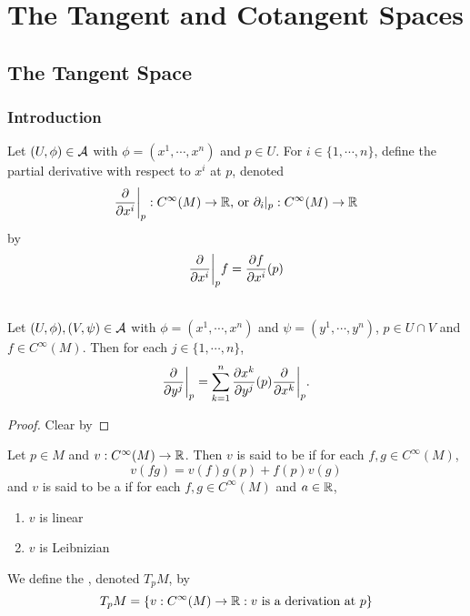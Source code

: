 \documentclass{book}
\begin{document}
	\newpage
	\chapter{The Tangent and Cotangent Spaces}
	\section{The Tangent Space}



	\subsection{Introduction}

	\begin{defn}
		Let $(U, \phi) \in \mathcal{A}$ with $\phi = (x^1, \cdots, x^n)$ and $p \in U$. For $i \in \{1, \cdots, n\}$, define the partial derivative with respect to $x^i$ at $p$, denoted $$\frac{\partial}{\partial x^i} \bigg|_p: C^{\infty}(M) \rightarrow \mathbb{R}  \text{, or } \partial_i|_p: C^{\infty}(M) \rightarrow \mathbb{R} $$ by $$ \frac{\partial}{\partial x^i} \bigg |_p  f =  \frac{\partial f}{\partial x^i}(p) $$
	\end{defn}

	\begin{ex} \\
		Let $(U, \phi), (V, \psi) \in \mathcal{A}$ with $\phi = (x^1, \cdots, x^n)$ and $\psi = (y^1, \cdots, y^n)$, $p \in U \cap V$ and $f \in C^{\infty}(M)$. Then for each $j \in \{1, \cdots, n\}$, 
		$$\frac{\partial}{\partial y^j} \bigg|_p = \sum_{k =1}^n \frac{\partial x^k}{\partial y^j} (p) \frac{\partial}{\partial x^k} \bigg|_p.$$
	\end{ex}
	
	\begin{proof}
		Clear by 
	\end{proof}

	\begin{defn}
		Let $p \in M$ and $v: C^{\infty}(M) \rightarrow \mathbb{R}$. Then $v$ is said to be  if for each $f,g \in  C^{\infty}(M)$, $$v(fg) = v(f)g(p) + f(p)v(g)$$ and $v$ is said to be a  if for each $f, g \in C^{\infty}(M)$ and $a \in \mathbb{R}$,
		\begin{enumerate}
			\item $v$ is linear 
			\item $v$ is Leibnizian
		\end{enumerate}
		We define the , denoted $T_pM$, by $$T_pM = \{ v: C^{\infty}(M) \rightarrow \mathbb{R}: v \text{ is a derivation at }p\}$$
	\end{defn}
\end{document}
